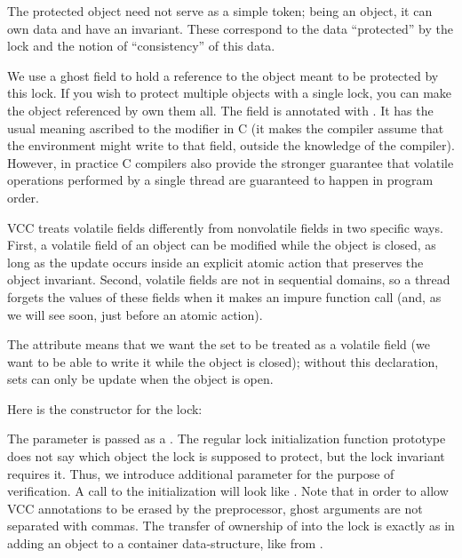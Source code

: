 The protected object need not serve as a simple token; being an
object, it can own data and have an invariant. These correspond to the
data ``protected'' by the lock and the notion of ``consistency'' of
this data.


\noindent
We use a ghost field to hold a reference to the object meant to be protected
by this lock.
If you wish to protect multiple objects with a single lock, you can make
the object referenced by  own them all.
The  field is annotated with .
It has the usual meaning ascribed to the modifier in C (\ie it makes the compiler
assume that the environment might write to that field, outside the knowledge
of the compiler). However, in practice C compilers also provide the 
stronger guarantee that volatile operations performed by a single
thread are guaranteed to happen in program order.

VCC treats volatile fields differently from nonvolatile fields in two
specific ways. First, a volatile field of an object can be modified
while the object is closed, as long as the update occurs inside an
explicit atomic action that preserves the object invariant. Second,
volatile fields are not in sequential domains, so a thread forgets the
values of these fields when it makes an impure function call (and, as
we will see soon, just before an atomic action).

The attribute
 means that we want the \vcc{\owns} set
to be treated as a volatile field (\ie we want to be able to write
it while the object is closed); without this declaration, \vcc{\owns}
sets can only be update when the object is open.

Here is the constructor for the lock:


\noindent
The parameter  is passed as a .
The regular lock initialization function prototype does not say which
object the lock is supposed to protect, but the lock invariant requires it.
Thus, we introduce additional parameter for the purpose of verification.
A call to the initialization will look like 
. Note that in order to allow VCC
annotations to be erased by the preprocessor, ghost arguments are not
separated with commas.
The transfer of ownership of  into the lock is exactly as in
adding an object to a container data-structure, like
 from .

